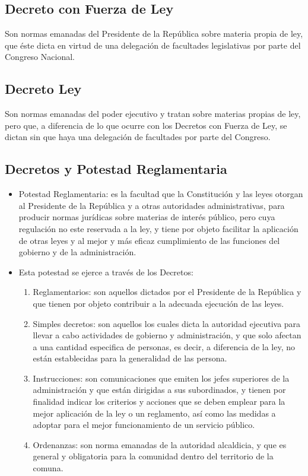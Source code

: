\documentclass{templateApunte}
\begin{document}
\subsection{Decreto con Fuerza de Ley}
Son normas emanadas del Presidente de la República sobre materia propia de ley, que \'este dicta en virtud de una delegación de facultades legislativas por parte del Congreso Nacional.

\subsection{Decreto Ley}
Son normas emanadas del poder ejecutivo y tratan sobre materias propias de ley, pero que, a diferencia de lo que ocurre con los Decretos con Fuerza de Ley, se dictan sin que haya una delegación de facultades por parte del Congreso.

\subsection{Decretos y Potestad Reglamentaria}
\begin{itemize}
  \item Potestad Reglamentaria: es la facultad que la Constitución y las leyes otorgan al Presidente de la República y a otras autoridades administrativas, para producir normas jurídicas sobre materias de interés público, pero cuya regulación no este reservada a la ley, y tiene por objeto facilitar la aplicación de otras leyes y al mejor y m\'as eficaz cumplimiento de las funciones del gobierno y de la administración.
  \item Esta potestad se ejerce a través de los Decretos:
  \begin{enumerate}
    \item Reglamentarios: son aquellos dictados por el Presidente de la República y que tienen por objeto contribuir a la adecuada ejecución de las leyes.
    \item Simples decretos: son aquellos los cuales dicta la autoridad ejecutiva para llevar a cabo actividades de gobierno y administración, y que solo afectan a una cantidad especifica de personas, es decir, a diferencia de la ley, no est\'an establecidas para la generalidad de las persona.
    \item Instrucciones: son comunicaciones que emiten los jefes superiores de la \newline administración y que est\'an dirigidas a sus subordinados, y tienen por finalidad indicar los criterios y acciones que se deben emplear para la mejor aplicación de la ley o un reglamento, as\'i como las medidas a adoptar para el mejor funcionamiento de un servicio público.
    \item Ordenanzas: son norma emanadas de la autoridad alcaldicia, y que es general y obligatoria para la comunidad dentro del territorio de la comuna.
  \end{enumerate}
\end{itemize}
\end{document}
